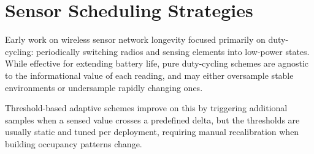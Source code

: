 \section{Sensor Scheduling Strategies}

Early work on wireless sensor network longevity focused primarily on duty-cycling: periodically
switching radios and sensing elements into low-power states. While effective for extending battery
life, pure duty-cycling schemes are agnostic to the informational value of each reading, and may
either oversample stable environments or undersample rapidly changing ones.

Threshold-based adaptive schemes improve on this by triggering additional samples when a sensed
value crosses a predefined delta, but the thresholds are usually static and tuned per deployment,
requiring manual recalibration when building occupancy patterns change.
